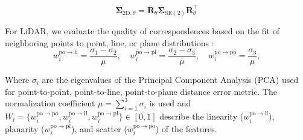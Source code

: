 \begin{equation}
\boldsymbol{\Sigma}_{2 \mathrm{D}, \theta}=\boldsymbol{R}_\theta \boldsymbol{\Sigma}_{\mathrm{SE(2)}} \boldsymbol{R}_\theta^{\top}    
\end{equation}





For LiDAR, we evaluate the quality of correspondences based on the fit of neighboring points to point, line, or plane distributions \cite{demantke2011dimensionality}:
\begin{equation}
 w_i^{\mathrm{po} \rightarrow \mathrm{li}}= \frac{\sigma_1 - \sigma_2}{\mu}, \quad  w_i^{\mathrm{po} \rightarrow \mathrm{pl}} = \frac{\sigma_2 - \sigma_3}{\mu}, \quad  w_i^{\mathrm{po} \rightarrow \mathrm{po}} = \frac{\sigma_3}{\mu},    
\end{equation}

Where \( \sigma_i \) are the eigenvalues of the Principal Component Analysis (PCA) used for point-to-point, point-to-line, point-to-plane distance error metric\cite{zhao2021super}. The normalization coefficient \( \mu = \sum_{i=1}^3 \sigma_i \) is used and
\( W_l = \{ w_i^{\mathrm{po} \rightarrow \mathrm{po}}, w_i^{\mathrm{po} \rightarrow \mathrm{li}}, w_i^{\mathrm{po} \rightarrow \mathrm{pl}} \} \in [0, 1] \) describe the linearity (\( w_i^{\mathrm{po} \rightarrow \mathrm{li}} \)), planarity (\( w_i^{\mathrm{po} \rightarrow \mathrm{pl}} \)), and scatter (\( w_i^{\mathrm{po} \rightarrow \mathrm{po}} \)) of the features.



